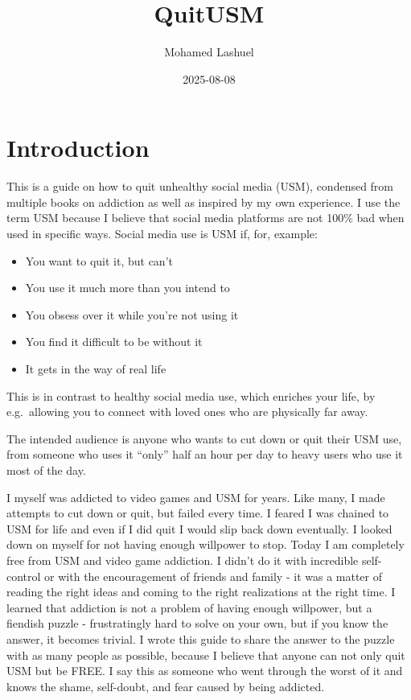 \documentclass[
  openany]{book}
\title{QuitUSM}
\author{Mohamed Lashuel}
\date{2025-08-08}
\providecommand{\tightlist}{%
  \setlength{\itemsep}{0pt}\setlength{\parskip}{0pt}}
\begin{document}
\maketitle

{
\setcounter{tocdepth}{1}
\tableofcontents
}
\chapter{Introduction}\label{introduction}

This is a guide on how to quit unhealthy social media (USM), condensed from multiple books on addiction as well as inspired by my own experience. I use the term USM because I believe that social media platforms are not 100\% bad when used in specific ways. Social media use is USM if, for, example:

\begin{itemize}
\tightlist
\item
  You want to quit it, but can't
\item
  You use it much more than you intend to
\item
  You obsess over it while you're not using it
\item
  You find it difficult to be without it
\item
  It gets in the way of real life
\end{itemize}

This is in contrast to healthy social media use, which enriches your life, by e.g.~allowing you to connect with loved ones who are physically far away.

The intended audience is anyone who wants to cut down or quit their USM use, from someone who uses it ``only'' half an hour per day to heavy users who use it most of the day.

I myself was addicted to video games and USM for years. Like many, I made attempts to cut down or quit, but failed every time. I feared I was chained to USM for life and even if I did quit I would slip back down eventually. I looked down on myself for not having enough willpower to stop. Today I am completely free from USM and video game addiction. I didn't do it with incredible self-control or with the encouragement of friends and family - it was a matter of reading the right ideas and coming to the right realizations at the right time. I learned that addiction is not a problem of having enough willpower, but a fiendish puzzle - frustratingly hard to solve on your own, but if you know the answer, it becomes trivial. I wrote this guide to share the answer to the puzzle with as many people as possible, because I believe that anyone can not only quit USM but be FREE. I say this as someone who went through the worst of it and knows the shame, self-doubt, and fear caused by being addicted.
\end{document}

